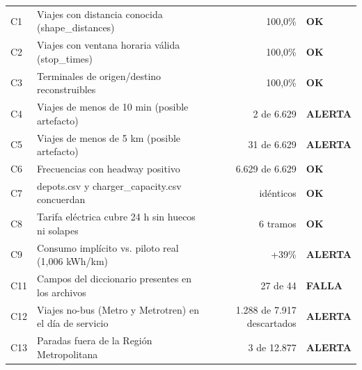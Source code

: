 
\begin{tabular}{l L{8.2cm} r l}
\thead{} &  &  &  \\
\midrule
C1 & Viajes con distancia conocida (shape\_distances) & 100{,}0\% & \textcolor{ink}{\textbf{OK}} \\
C2 & Viajes con ventana horaria válida (stop\_times) & 100{,}0\% & \textcolor{ink}{\textbf{OK}} \\
C3 & Terminales de origen/destino reconstruibles & 100{,}0\% & \textcolor{ink}{\textbf{OK}} \\
C4 & Viajes de menos de 10 min (posible artefacto) & 2 de 6.629 & \textcolor{amber}{\textbf{ALERTA}} \\
C5 & Viajes de menos de 5 km (posible artefacto) & 31 de 6.629 & \textcolor{amber}{\textbf{ALERTA}} \\
C6 & Frecuencias con headway positivo & 6.629 de 6.629 & \textcolor{ink}{\textbf{OK}} \\
C7 & depots.csv y charger\_capacity.csv concuerdan & idénticos & \textcolor{ink}{\textbf{OK}} \\
C8 & Tarifa eléctrica cubre 24 h sin huecos ni solapes & 6 tramos & \textcolor{ink}{\textbf{OK}} \\
C9 & Consumo implícito vs. piloto real (1{,}006 kWh/km) & +39\% & \textcolor{amber}{\textbf{ALERTA}} \\
C11 & Campos del diccionario presentes en los archivos & 27 de 44 & \textcolor{critred}{\textbf{FALLA}} \\
C12 & Viajes no-bus (Metro y Metrotren) en el día de servicio & 1.288 de 7.917 descartados & \textcolor{amber}{\textbf{ALERTA}} \\
C13 & Paradas fuera de la Región Metropolitana & 3 de 12.877 & \textcolor{amber}{\textbf{ALERTA}} \\
\bottomrule
\end{tabular}
